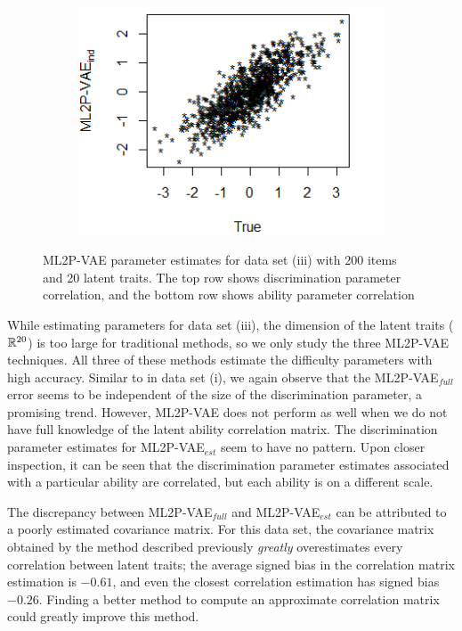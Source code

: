 \begin{figure}[h]
\begin{subfigure}{.32\textwidth}
    \end{subfigure}
    \begin{subfigure}{.32\textwidth}
      \centering
      \includegraphics[width=.9\linewidth]{img/ml_journal_results/20skills/vae_ind_theta_20skills.png}
    \end{subfigure}
    \caption{ML2P-VAE parameter estimates for data set (iii) with 200 items and 20 latent traits. The top row shows discrimination parameter correlation, and the bottom row shows ability parameter correlation}
    \label{fig:20skill_cor}
\end{figure}

While estimating parameters for data set (iii), the dimension of the latent traits ($\mathbb{R}^{20}$) is too large for traditional methods, so we only study the three ML2P-VAE techniques. All three of these methods estimate the difficulty parameters with high accuracy. Similar to in data set (i), we again observe that the ML2P-VAE$_{full}$ error seems to be independent of the size of the discrimination parameter, a promising trend. However, ML2P-VAE does not perform as well when we do not have full knowledge of the latent ability correlation matrix. The discrimination parameter estimates for ML2P-VAE$_{est}$ seem to have no pattern. Upon closer inspection, it can be seen that the discrimination parameter estimates associated with a particular ability are correlated, but each ability is on a different scale. 

The discrepancy between ML2P-VAE$_{full}$ and ML2P-VAE$_{est}$ can be attributed to a poorly estimated covariance matrix. For this data set, the covariance matrix obtained by the method described previously \textit{greatly} overestimates every correlation between latent traits; the average signed bias in the correlation matrix estimation is $-0.61$, and even the closest correlation estimation has signed bias $-0.26$. Finding a better method to compute an approximate correlation matrix could greatly improve this method.

